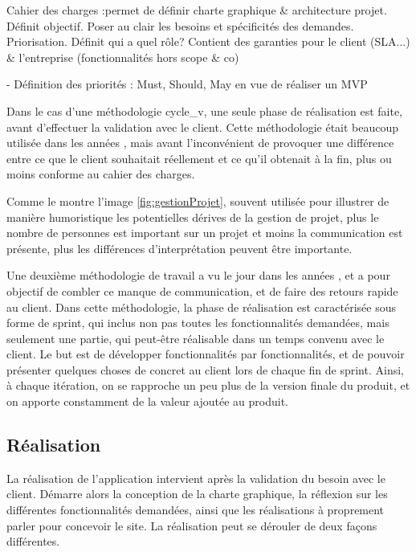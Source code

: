 Cahier des charges :permet de définir charte graphique \& architecture projet. Définit objectif. Poser au clair les besoins et spécificités des demandes. Priorisation. Définit qui a quel rôle? Contient des garanties pour le client (SLA...) \& l'entreprise (fonctionnalités hors scope \& co)

- Définition des priorités : Must, Should, May en vue de réaliser un MVP

Dans le cas d'une méthodologie \gls{cycle_v}, une seule phase de réalisation est faite, avant d'effectuer la validation avec le client. Cette méthodologie était beaucoup utilisée dans les années , mais avant l'inconvénient de provoquer une différence entre ce que le client souhaitait réellement et ce qu'il obtenait à la fin, plus ou moins conforme au cahier des charges. 


Comme le montre l'image \ref{fig:gestionProjet}, souvent utilisée pour illustrer de manière humoristique les potentielles dérives de la gestion de projet, plus le nombre de personnes est important sur un projet et moins la communication est présente, plus les différences d'interprétation peuvent être importante. 

Une deuxième méthodologie de travail a vu le jour dans les années , et a pour objectif de combler ce manque de communication, et de faire des retours rapide au client. Dans cette méthodologie, la phase de réalisation est caractérisée sous forme de sprint, qui inclus non pas toutes les fonctionnalités demandées, mais seulement une partie, qui peut-être réalisable dans un temps convenu avec le client. Le but est de développer fonctionnalités par fonctionnalités, et de pouvoir présenter quelques choses de concret au client lors de chaque fin de sprint. Ainsi, à chaque itération, on se rapproche un peu plus de la version finale du produit, et on apporte constamment de la valeur ajoutée au produit.


\subsection{Réalisation}

La réalisation de l'application intervient après la validation du besoin avec le client. Démarre alors la conception de la charte graphique, la réflexion sur les différentes fonctionnalités demandées, ainsi que les réalisations à proprement parler pour concevoir le site. La réalisation peut se dérouler de deux façons différentes.


